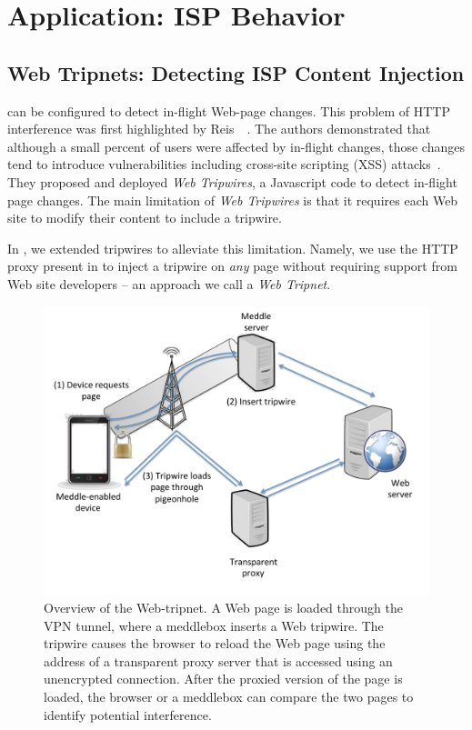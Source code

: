 \section{Application: ISP Behavior}



\subsection{Web Tripnets: Detecting ISP Content Injection}

\meddle can be configured to detect in-flight Web-page changes. 
This problem of HTTP interference was first highlighted by Reis~\etal~\cite{reis:tripwires}. 
The authors demonstrated that although a small percent of users were affected by in-flight changes, those changes tend to introduce vulnerabilities including cross-site scripting (XSS) attacks~\cite{reis:tripwires}. 
They proposed and deployed \emph{Web Tripwires}, a Javascript code to detect in-flight page changes. 
The main limitation of \emph{Web Tripwires} is that it requires each Web site to modify their content to include a tripwire.

In \meddle, we extended tripwires to alleviate this limitation. 
Namely, we use the HTTP proxy present in \meddle to inject a tripwire on \emph{any} page without requiring support from Web site developers -- an approach we call a \emph{Web Tripnet}.



\begin{figure}
\centering
\includegraphics[width=0.9\linewidth]{figures/tripnet.pdf}
\caption{Overview of the \meddle Web-tripnet. A Web page is loaded
through the VPN tunnel, where a meddlebox inserts a Web tripwire. The
tripwire causes the browser to reload the Web page using the address of a
transparent proxy server that is accessed using an unencrypted connection.
After the proxied version of the page is loaded, the browser or a meddlebox
can compare the two pages to identify potential interference. }
\label{fig:tripnet}
\end{figure}

